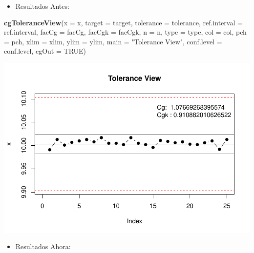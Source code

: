 \documentclass[
]{book}
\newenvironment{Shaded}{\begin{snugshade}}{\end{snugshade}}
\newcommand{\AttributeTok}[1]{\textcolor[rgb]{0.13,0.29,0.53}{#1}}
\newcommand{\ConstantTok}[1]{\textcolor[rgb]{0.56,0.35,0.01}{#1}}
\newcommand{\FunctionTok}[1]{\textcolor[rgb]{0.13,0.29,0.53}{\textbf{#1}}}
\newcommand{\NormalTok}[1]{#1}
\newcommand{\StringTok}[1]{\textcolor[rgb]{0.31,0.60,0.02}{#1}}
\providecommand{\tightlist}{%
  \setlength{\itemsep}{0pt}\setlength{\parskip}{0pt}}
\begin{document}
\begin{itemize}
\tightlist
\item
  Resultados Antes:
\end{itemize}

\begin{Shaded}
\begin{Highlighting}[]
\FunctionTok{cgToleranceView}\NormalTok{(}\AttributeTok{x =}\NormalTok{ x, }\AttributeTok{target =}\NormalTok{ target, }\AttributeTok{tolerance =}\NormalTok{ tolerance, }
                \AttributeTok{ref.interval =}\NormalTok{ ref.interval, }\AttributeTok{facCg =}\NormalTok{ facCg, }\AttributeTok{facCgk =}\NormalTok{ facCgk, }
                \AttributeTok{n =}\NormalTok{ n, }\AttributeTok{type =}\NormalTok{ type, }\AttributeTok{col =}\NormalTok{ col, }\AttributeTok{pch =}\NormalTok{ pch, }\AttributeTok{xlim =}\NormalTok{ xlim, }
                \AttributeTok{ylim =}\NormalTok{ ylim, }\AttributeTok{main =} \StringTok{"Tolerance View"}\NormalTok{, }\AttributeTok{conf.level =}\NormalTok{ conf.level, }\AttributeTok{cgOut =} \ConstantTok{TRUE}\NormalTok{)}
\end{Highlighting}
\end{Shaded}

\includegraphics{Libro_TidyQualityTools_files/figure-latex/unnamed-chunk-150-1.pdf}

\begin{itemize}
\tightlist
\item
  Resultados Ahora:
\end{itemize}
\end{document}
